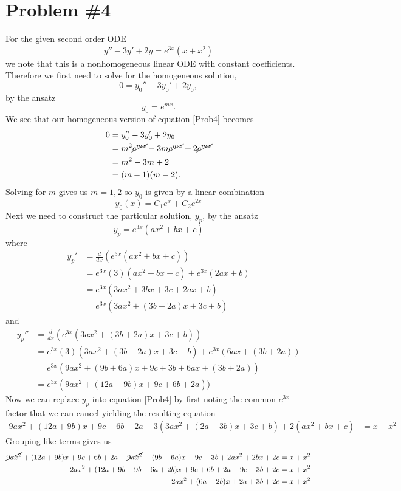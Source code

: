 \documentclass[11pt]{article}
\numberwithin{equation}{section}
\begin{document}
\pagebreak

\section{Problem \#4}
For the given second order ODE
\begin{equation}
y'' - 3y' + 2y = e^{3x}(x+x^2)
\label{Prob4}
\end{equation}
we note that this is a nonhomogeneous linear ODE with constant coefficients. Therefore we 
first need to solve for the homogeneous solution, 
$$0 = y_0'' - 3y_0' + 2y_0,$$ 
by the ansatz 
$$y_0 = e^{mx}.$$
We see that our homogeneous version of equation \ref{Prob4} becomes
\begin{align*}
0 &= y_0'' - 3y_0' + 2y_0\\
&= m^2\cancel{e^{mx}} - 3m\cancel{e^{mx}} + 2\cancel{e^{mx}}\\
&= m^2 - 3m + 2\\
&= (m-1)(m-2).
\end{align*}
Solving for $m$ gives us $m =1,2$ so $y_0$ is given by a linear combination 
$$y_0(x) = C_1e^{x} + C_2e^{2x}$$
Next we need to construct the particular solution, $y_p$, by the ansatz
$$y_p = e^{3x}(ax^2+bx+c)$$
where
\begin{align*}
y_p' &= \frac{d}{dx}\left(e^{3x}(ax^2+bx+c)\right)\\
&= e^{3x}(3)(ax^2+bx+c) + e^{3x}(2ax+b)\\
&= e^{3x}(3ax^2+3bx+3c+2ax+b)\\
&= e^{3x}(3ax^2+(3b+2a)x+3c+b)
\end{align*}
and
\begin{align*}
y_p'' &= \frac{d}{dx}\left(e^{3x}(3ax^2+(3b+2a)x+3c+b)\right)\\
&= e^{3x}(3)(3ax^2+(3b+2a)x+3c+b) + e^{3x}(6ax+(3b+2a))\\
&= e^{3x}(9ax^2+(9b+6a)x+9c+3b + 6ax+(3b+2a))\\
&= e^{3x}(9ax^2+(12a+9b)x+9c+6b+2a))
\end{align*}
Now we can replace $y_p$ into equation \ref{Prob4} by first noting the common $e^{3x}$ factor
that we can cancel yielding the resulting equation 
\begin{align*}
9ax^2+(12a+9b)x+9c+6b+2a - 3(3ax^2+(2a+3b)x+3c+b) + 2(ax^2+bx+c) &= x+x^2
\end{align*}
Grouping like terms gives us
\begin{align*}
\cancel{9ax^2}+(12a+9b)x+9c+6b+2a - \cancel{9ax^2} - (9b+6a)x - 9c - 3b + 2ax^2 + 2bx + 2c &= x+x^2\\
2ax^2 + (12a+9b-9b-6a+2b)x + 9c+6b+2a-9c-3b+2c &= x+x^2\\
2ax^2 + (6a+2b)x + 2a+3b+2c &= x+x^2
\end{align*}
\end{document}
